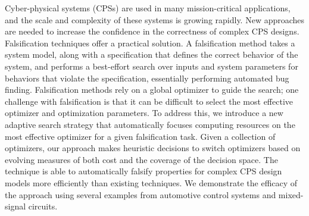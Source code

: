 Cyber-physical systems (CPSs) are used in many mission-critical applications, and the scale and complexity of these systems is growing rapidly.
New approaches are needed to increase the confidence in the correctness of complex CPS designs.
Falsification techniques offer a practical solution. 
A falsification method takes a system model, along with a specification that defines the correct behavior of the system, and performs a best-effort search over inputs and system parameters for behaviors that violate the specification, essentially performing automated bug finding.
Falsification methods rely on a global optimizer to guide the search; one challenge with falsification is that it can be difficult to select the most effective optimizer and optimization parameters.
To address this, we introduce a new adaptive search strategy that automatically focuses computing resources on the most effective optimizer for a given falsification task.
Given a collection of optimizers, our approach makes heuristic decisions to switch optimizers based on
evolving measures of both cost and the coverage of the decision space.
The technique is able to automatically falsify properties for complex CPS design models more efficiently than existing techniques.
We demonstrate the efficacy of the approach using several examples from automotive control systems and mixed-signal circuits.